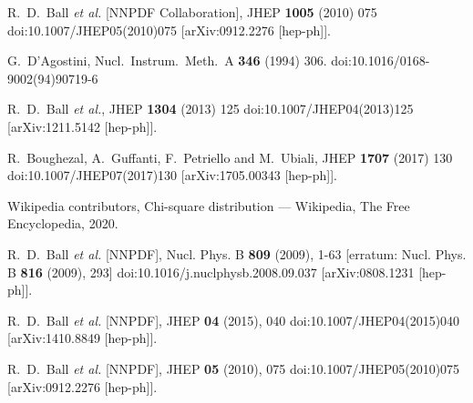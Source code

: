 \documentclass[10pt,a4paper]{article}
\begin{document}
\newpage
\begin{thebibliography}{alp}

  R.~D.~Ball {\it et al.} [NNPDF Collaboration],
  JHEP {\bf 1005} (2010) 075
  doi:10.1007/JHEP05(2010)075
  [arXiv:0912.2276 [hep-ph]].

  G.~D'Agostini,
  Nucl.\ Instrum.\ Meth.\ A {\bf 346} (1994) 306.
  doi:10.1016/0168-9002(94)90719-6

  R.~D.~Ball {\it et al.},
  JHEP {\bf 1304} (2013) 125
  doi:10.1007/JHEP04(2013)125
  [arXiv:1211.5142 [hep-ph]].

  R.~Boughezal, A.~Guffanti, F.~Petriello and M.~Ubiali,
  JHEP {\bf 1707} (2017) 130
  doi:10.1007/JHEP07(2017)130
  [arXiv:1705.00343 [hep-ph]].

    Wikipedia contributors,
    Chi-square distribution --- {Wikipedia}{,} The Free Encyclopedia,
    2020.

R.~D.~Ball \textit{et al.} [NNPDF],
Nucl. Phys. B \textbf{809} (2009), 1-63
[erratum: Nucl. Phys. B \textbf{816} (2009), 293]
doi:10.1016/j.nuclphysb.2008.09.037
[arXiv:0808.1231 [hep-ph]].

R.~D.~Ball \textit{et al.} [NNPDF],
JHEP \textbf{04} (2015), 040
doi:10.1007/JHEP04(2015)040
[arXiv:1410.8849 [hep-ph]].

R.~D.~Ball \textit{et al.} [NNPDF],
JHEP \textbf{05} (2010), 075
doi:10.1007/JHEP05(2010)075
[arXiv:0912.2276 [hep-ph]].

\end{thebibliography}
\end{document}
